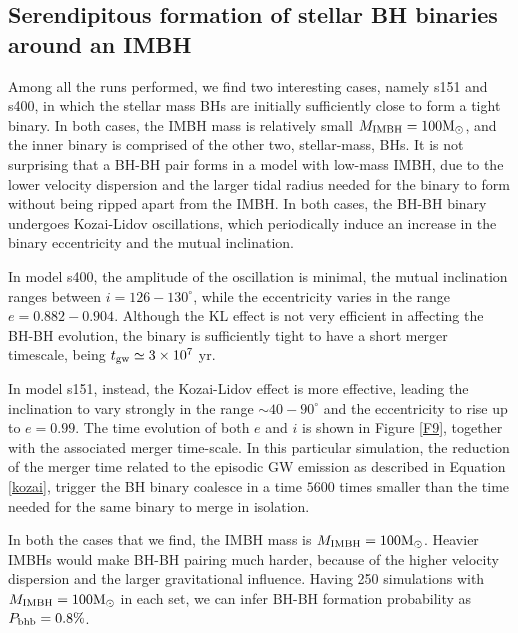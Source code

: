 \documentclass[twocolumn]{aastex62}
\newcommand{\Ms}{{\rm M}_\odot}
\newcommand{\ibh}{{\rm IMBH}}
\begin{document}
\subsection{Serendipitous formation of stellar BH binaries around an IMBH}

Among all the runs performed, we find two interesting cases, namely s151 and s400, in which the stellar mass BHs are initially sufficiently close to form a tight binary. In both cases, the IMBH mass is relatively small $M_{\ibh} = 100\Ms$, and the inner binary is comprised of the other two, stellar-mass, BHs. It is not surprising that a BH-BH pair forms in a model with low-mass IMBH, due to the lower velocity dispersion and the larger tidal radius needed for the binary to form without being ripped apart from the IMBH. In both cases, the BH-BH binary undergoes Kozai-Lidov oscillations, which periodically induce an increase in the binary eccentricity and the mutual inclination.

In model s400, the amplitude of the oscillation is minimal, the mutual inclination ranges between $i = 126-130^\circ$, while the eccentricity varies in the range $e = 0.882-0.904$. Although the KL effect is not very efficient in affecting the BH-BH evolution, the binary is sufficiently tight to have a short merger timescale, being $t_{\rm gw} \simeq 3\times 10^7$ yr.

In model s151, instead, the Kozai-Lidov effect is more effective, leading the inclination to vary strongly in the range $\sim 40-90^\circ$ and the eccentricity to rise up to $e = 0.99$. The time evolution of both $e$ and $i$ is shown in Figure \ref{F9}, together with the associated merger time-scale. 
In this particular simulation, the reduction of the merger time related to the episodic GW emission as described in Equation \ref{kozai}, trigger the BH binary coalesce in a time $5600$ times smaller than the time needed for the same binary to merge in isolation.

In both the cases that we find, the IMBH mass is $M_\ibh=100\Ms$. Heavier IMBHs would make BH-BH pairing much harder, because of the higher velocity dispersion and the larger gravitational influence. Having 250 simulations with $M_\ibh=100\Ms$ in each set, we can infer BH-BH formation probability as $P_{\rm bhb} = 0.8\%$.
\end{document}
